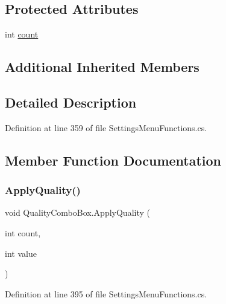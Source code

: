 \subsection*{Protected Attributes}
\begin{DoxyCompactItemize}
\item 
int \hyperlink{class_quality_combo_box_abef900f73a92b47a08e22be563a58515}{count}
\end{DoxyCompactItemize}
\subsection*{Additional Inherited Members}


\subsection{Detailed Description}


Definition at line 359 of file Settings\+Menu\+Functions.\+cs.



\subsection{Member Function Documentation}
\mbox{\label{class_quality_combo_box_acec568a71ccbc0d4a9fd727371f5eb5b}} 
\subsubsection{\texorpdfstring{Apply\+Quality()}{ApplyQuality()}}
{\footnotesize\ttfamily void Quality\+Combo\+Box.\+Apply\+Quality (\begin{DoxyParamCaption}\item[{int}]{count,  }\item[{int}]{value }\end{DoxyParamCaption})}



Definition at line 395 of file Settings\+Menu\+Functions.\+cs.

\mbox{\label{class_quality_combo_box_a6f05c237068e72d2221a58425d17f402}} 
